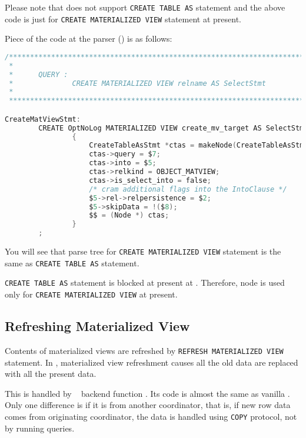   Please note that \XC{} does not support \texttt{CREATE TABLE AS} statement and the above
  code is just for \texttt{CREATE MATERIALIZED VIEW} statement at present.
  
  Piece of the code at the parser () is as follows:

  \begin{lstlisting}[frame=single, tabsize=4, language=C]
/*****************************************************************************
 *
 *      QUERY :
 *              CREATE MATERIALIZED VIEW relname AS SelectStmt
 *
 *****************************************************************************/

CreateMatViewStmt:
        CREATE OptNoLog MATERIALIZED VIEW create_mv_target AS SelectStmt opt_with_data
                {
                    CreateTableAsStmt *ctas = makeNode(CreateTableAsStmt);
                    ctas->query = $7;
                    ctas->into = $5;
                    ctas->relkind = OBJECT_MATVIEW;
                    ctas->is_select_into = false;
                    /* cram additional flags into the IntoClause */
                    $5->rel->relpersistence = $2;
                    $5->skipData = !($8);
                    $$ = (Node *) ctas;
                }
        ;
  \end{lstlisting}

  You will see that parse tree for \texttt{CREATE MATERIALIZED VIEW} statement is the same as
  \texttt{CREATE TABLE AS} statement.
  
  \texttt{CREATE TABLE AS} statement is blocked at present at .
  Therefore,  node is used only for \texttt{CREATE MATERIALIZED VIEW}
  at present.



\subsection{Refreshing Materialized View}

  Contents of materialized views are refreshed by \texttt{REFRESH MATERIALIZED VIEW} statement.
  In \XC, materialized view refreshment causes all the old data are replaced with all the
  present data.
  
  This is handled by \PG~ backend function .
  Its code is almost the same as vanilla \PG.
  Only one difference is if it is from another coordinator, that is, if new row data comes
  from originating coordinator, the data is handled using \texttt{COPY} protocol, not by
  running queries.
  
